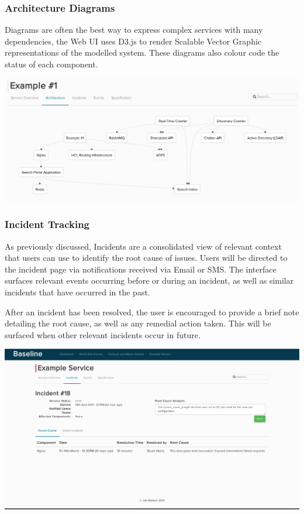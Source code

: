 \documentclass{cshonours}
\begin{document}
\subsubsection{Architecture Diagrams}

Diagrams are often the best way to express complex services with many dependencies, the Web UI uses D3.js to render Scalable Vector Graphic representations of the modelled system. These diagrams also colour code the status of each component.

\begin{center}
  \label{webui-architecture}
  \includegraphics[scale=0.33]{web-ui/architecture.png}
\end{center}

\subsubsection{Incident Tracking}

As previously discussed, Incidents are a consolidated view of relevant context that users can use to identify the root cause of issues. Users will be directed to the incident page via notifications received via Email or SMS\@. The interface surfaces relevant events occurring before or during an incident, as well as similar incidents that have occurred in the past.

After an incident has been resolved, the user is encouraged to provide a brief note detailing the root cause, as well as any remedial action taken. This will be surfaced when other relevant incidents occur in future.

\begin{center}
  \label{webui-incidents}
  \includegraphics[scale=0.28]{web-ui/incidents.png}
\end{center}
\end{document}
